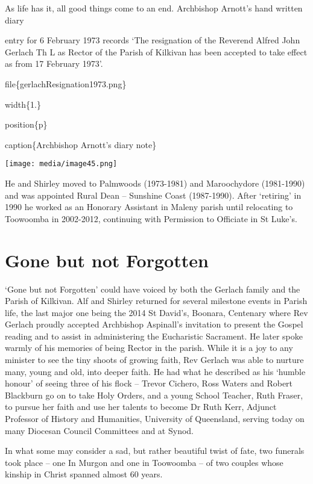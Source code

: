 As life has it, all good things come to an end. Archbishop Arnott's hand written diary

entry for 6 February 1973 records `The resignation of the Reverend Alfred John Gerlach Th L as Rector of the Parish of Kilkivan has been accepted to take effect as from 17 February 1973'.

file\{gerlachResignation1973.png\}

width\{1.\}

position\{p\}

caption\{Archbishop Arnott's diary note\}

\texttt{[image: media/image45.png]}

He and Shirley moved to Palmwoods (1973-1981) and Maroochydore (1981-1990) and was appointed Rural Dean -- Sunshine Coast (1987-1990). After `retiring' in 1990 he worked as an Honorary Assistant in Maleny parish until relocating to Toowoomba in 2002-2012, continuing with Permission to Officiate in St Luke's.

\hypertarget{gone-but-not-forgotten}{%
\section{Gone but not Forgotten}\label{gone-but-not-forgotten}}

`Gone but not Forgotten' could have voiced by both the Gerlach family and the Parish of Kilkivan. Alf and Shirley returned for several milestone events in Parish life, the last major one being the 2014 St David's, Boonara, Centenary where Rev Gerlach proudly accepted Archbishop Aspinall's invitation to present the Gospel reading and to assist in administering the Eucharistic Sacrament. He later spoke warmly of his memories of being Rector in the parish. While it is a joy to any minister to see the tiny shoots of growing faith, Rev Gerlach was able to nurture many, young and old, into deeper faith. He had what he described as his `humble honour' of seeing three of his flock -- Trevor Cichero, Ross Waters and Robert Blackburn go on to take Holy Orders, and a young School Teacher, Ruth Fraser, to pursue her faith and use her talents to become Dr Ruth Kerr, Adjunct Professor of History and Humanities, University of Queensland, serving today on many Diocesan Council Committees and at Synod.

In what some may consider a sad, but rather beautiful twist of fate, two funerals took place -- one In Murgon and one in Toowoomba -- of two couples whose kinship in Christ spanned almost 60 years.

